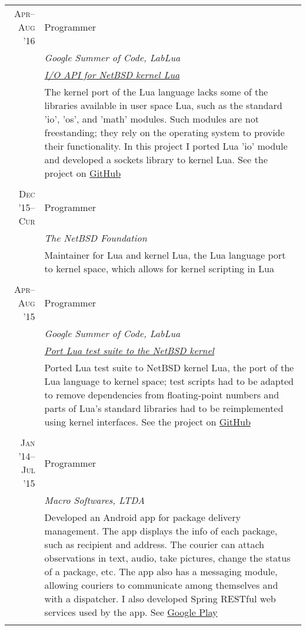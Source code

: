 \documentclass[a4paper,10pt]{article}
\begin{document}
\begin{longtable}{r|p{11cm}}

  \textsc{Apr--Aug '16} & Programmer \\
  &\emph{Google Summer of Code, LabLua}\\
  &\emph{\footnotesize{\href{https://goo.gl/g8Mb2M}{I/O API for NetBSD kernel Lua}}}\\
  &\footnotesize{The kernel port of the Lua language lacks some of the libraries
  available in user space Lua, such as the standard 'io', 'os', and 'math' modules. 
  Such modules are not freestanding; they rely on the operating system to provide
  their functionality. In this project I ported Lua 'io' module and developed a 
  sockets library to kernel Lua. See the project on 
  \href{https://GitHub.com/salazar/luaio}{GitHub}}
  \\\multicolumn{2}{c}{} \\

  \textsc{Dec '15--Cur}
  & Programmer \\
  &\emph{The NetBSD Foundation}\\
  &\footnotesize{Maintainer for Lua and kernel Lua, the Lua language
  port to kernel space, which allows for kernel scripting in Lua}
  \\\multicolumn{2}{c}{} \\
  
  \textsc{Apr--Aug '15}
  & Programmer \\
  &\emph{Google Summer of Code, LabLua}\\
  &\emph{\footnotesize{\href{https://goo.gl/xSl1bW}{Port Lua test
         suite to the NetBSD kernel}}}\\
  &\footnotesize{Ported Lua test suite to NetBSD kernel Lua, the port of the Lua
  language to kernel space; test scripts
   had to be adapted to remove dependencies from floating-point numbers and parts
   of Lua's standard libraries had to be reimplemented using kernel interfaces.
   See the project on 
   \href{https://GitHub.com/salazar/luatests}{GitHub}}
  \\\multicolumn{2}{c}{} \\

  \textsc{Jan '14--Jul '15}
  & Programmer \\
  &\emph{Macro Softwares, LTDA}\\
  &\footnotesize{Developed an Android app for package delivery management. The
  app displays the info of each package, such as recipient and address.
  The courier can attach observations in text, audio, take pictures,
  change the status of a package, etc. The app also has a messaging module,
  allowing couriers to communicate among themselves and with a dispatcher. 
  I also developed Spring RESTful web services used by the app. See 
  \href{https://play.google.com/store/apps/details?id=br.com.entregadoronline}{Google Play}} \\
  \multicolumn{2}{c}{} \\


\end{longtable}
\end{document}
